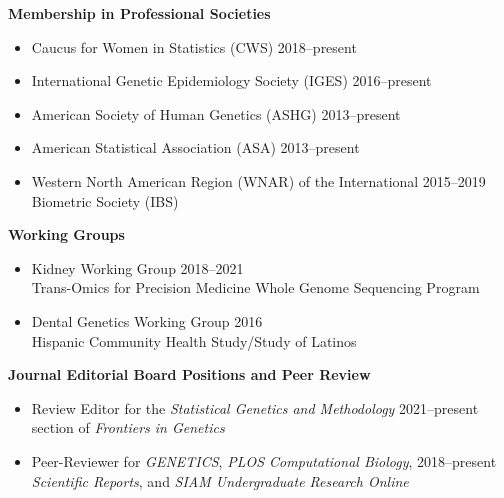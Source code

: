 \documentclass[margin]{res}
\begin{document}
\begin{resume}
\textbf{Membership in Professional Societies}
\begin{itemize}	 %
\item Caucus for Women in Statistics (CWS) \hfill 2018--present
\item International Genetic Epidemiology Society (IGES) \hfill 2016--present
\item American Society of Human Genetics (ASHG) \hfill 2013--present
\item American Statistical Association (ASA) \hfill 2013--present
\item Western North American Region (WNAR) of the International \hfill 2015--2019 \\  Biometric Society (IBS)  \\
\end{itemize}
	
\textbf{Working Groups} 
\begin{itemize} %
\item Kidney Working Group \hfill 2018--2021 \\ Trans-Omics for Precision Medicine Whole Genome Sequencing Program 
\item Dental Genetics Working Group \hfill 2016 \\ Hispanic Community Health Study/Study of Latinos \\
\end{itemize}

\textbf{Journal Editorial Board Positions and Peer Review} 
\begin{itemize} %
\item Review Editor for the \textit{Statistical Genetics and Methodology}  \hfill 2021--present \\ section of \textit{Frontiers in Genetics} 
\item Peer-Reviewer for \textit{GENETICS}, \textit{PLOS Computational Biology}, \hfill 2018--present \\  \textit{Scientific Reports}, and \textit{SIAM Undergraduate Research Online} \\
\end{itemize} %


\end{resume}
\end{document}
